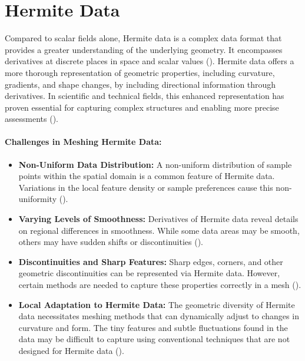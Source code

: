 \section{Hermite Data} \label{Section 2.2}
Compared to scalar fields alone, Hermite data is a complex data format that provides a greater understanding of the underlying geometry. It encompasses derivatives at discrete places in space and scalar values (\cite{Hammarstrom_2013}). Hermite data offers a more thorough representation of geometric properties, including curvature, gradients, and shape changes, by including directional information through derivatives. In scientific and technical fields, this enhanced representation has proven essential for capturing complex structures and enabling more precise assessments (\cite{Markiewicz_Koperwas_2021}).

\paragraph{Challenges in Meshing Hermite Data:}
\begin{itemize}
    \item \textbf{Non-Uniform Data Distribution:} A non-uniform distribution of sample points within the spatial domain is a common feature of Hermite data. Variations in the local feature density or sample preferences cause this non-uniformity (\cite{Hammarstrom_2013}).
    \item \textbf{Varying Levels of Smoothness:} Derivatives of Hermite data reveal details on regional differences in smoothness. While some data areas may be smooth, others may have sudden shifts or discontinuities (\cite{Dai_2007}).
    \item \textbf{Discontinuities and Sharp Features:} Sharp edges, corners, and other geometric discontinuities can be represented via Hermite data. However, certain methods are needed to capture these properties correctly in a mesh (\cite{Hammarstrom_2013}).
    \item \textbf{Local Adaptation to Hermite Data:} The geometric diversity of Hermite data necessitates meshing methods that can dynamically adjust to changes in curvature and form. The tiny features and subtle fluctuations found in the data may be difficult to capture using conventional techniques that are not designed for Hermite data (\cite{Dai_2007}).
\end{itemize}

